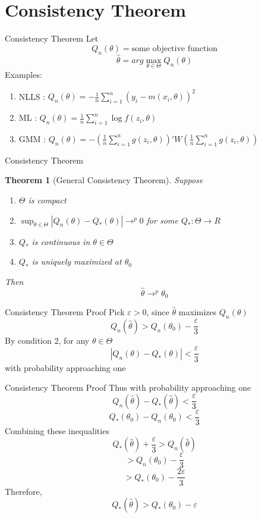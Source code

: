 \documentclass{beamer}
\newtheorem{thm}{Theorem}[subsection]
\begin{document}
\section{Consistency Theorem}
\begin{frame}{Consistency Theorem}
	Let 
	\[Q_n(\theta) = \text{some objective function}\]
	\[\hat{\theta} = arg\max_{\theta \in \Theta} Q_n(\theta)\]
	Examples:
	\begin{enumerate}
		\item NLLS : $Q_n(\theta) = - \frac{1}{n} \sum^n_{i=1} (y_i - m(x_i,\theta))^2$
		\item ML : $Q_n(\theta) = \frac{1}{n} \sum^n_{i=1} \log f(z_i,\theta)$
		\item GMM : $Q_n(\theta) = - (\frac{1}{n} \sum^n_{i=1} g(z_i,\theta))' W (\frac{1}{n} \sum^n_{i=1}g(z_i,\theta))$
	\end{enumerate}
\end{frame}
\begin{frame}{Consistency Theorem}
	\begin{thm}[General Consistency Theorem]
		Suppose
		\begin{enumerate}
				\item $\Theta$ is compact
				\item $\sup_{\theta \in \Theta} |Q_n(\theta) - Q_{*} (\theta)| \rightarrow^p 0$ for some $Q_*:\Theta \rightarrow R$
				\item $Q_*$ is continuous in $\theta \in \Theta$
				\item $Q_*$ is uniquely maximized at $\theta_0$
		\end{enumerate}
		Then 
		\[\hat{\theta} \rightarrow^p \theta_0\]
	\end{thm}
\end{frame}
\begin{frame}{Consistency Theorem Proof}
	Pick $\varepsilon>0$, since $\hat{\theta} $ maximizes $Q_n(\theta)$
 \[Q_n(\hat{\theta}) > Q_n(\theta_0) - \frac{\varepsilon}{3}\]
 By condition 2, for any $\theta \in \Theta$
 \[|Q_n(\theta) - Q_*(\theta)| < \frac{\varepsilon}{3}\]
 with probability approaching one
\end{frame}
\begin{frame}{Consistency Theorem Proof}
	Thus with  probability approaching one
	\[Q_n(\hat{\theta}) - Q_*(\hat{\theta}) < \frac{\varepsilon}{3}\]
	\[Q_*(\theta_0) - Q_n(\theta_0) < \frac{\varepsilon}{3}\]
	Combining these inequalities
	\[Q_*(\hat{\theta}) + \frac{\varepsilon}{3} > Q_n(\hat{\theta})\]
	\[> Q_n(\theta_0) - \frac{\varepsilon}{3}\]
	\[> Q_*(\theta_0) - \frac{2 \varepsilon}{3}\]
	Therefore,
	\[Q_*(\hat{\theta}) >Q_*(\theta_0) - \varepsilon\]
\end{frame}
\end{document}
